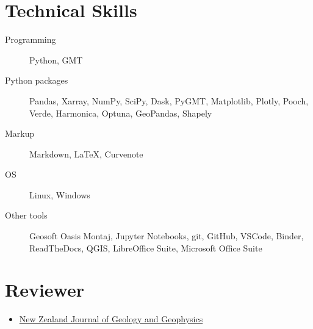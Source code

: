\documentclass{ExpressiveResume}
\begin{document}
\section{Technical Skills}

\begin{description}
    \item[Programming] Python, GMT
    \item[Python packages] Pandas, Xarray, NumPy, SciPy, Dask, PyGMT,
        Matplotlib, Plotly, Pooch, Verde, Harmonica, Optuna, GeoPandas, Shapely
    \item[Markup] Markdown, \LaTeX, Curvenote
    \item[OS] Linux, Windows
    \item[Other tools] Geosoft Oasis Montaj, Jupyter Notebooks, git, GitHub, VSCode, Binder,
    ReadTheDocs, QGIS, LibreOffice Suite, Microsoft Office Suite
\end{description}


\section{Reviewer}

\begin{itemize}[label={}, leftmargin=*]
    \item \href{https://www.tandfonline.com/toc/tnzg20/current}{New
              Zealand Journal of Geology and Geophysics}
\end{itemize}
\end{document}
